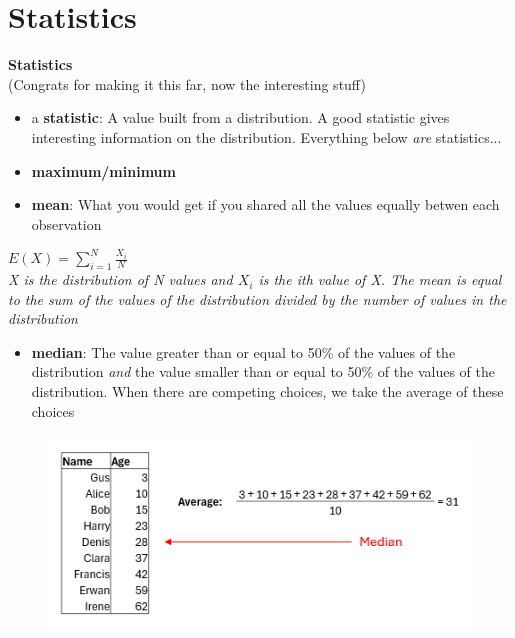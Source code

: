 \documentclass[compress]{beamer}
\begin{document}
\section{Statistics}
\begin{frame}[plain]
    \centering \Large
    \textbf{Statistics} \\
	(Congrats for making it this far, now the interesting stuff)
\end{frame}

\begin{frame}
	\begin{itemize}
		\item a \textbf{statistic}: A value built from a distribution. A good statistic gives interesting information on the distribution. Everything below \textit{are} statistics...
		\vspace{0.2cm}
		\item \textbf{maximum/minimum}
		\vspace{0.2cm}
		\item \textbf{mean}: What you would get if you shared all the values equally betwen each observation
	\end{itemize}
	\vspace{0.2cm}
	$E(X) = \sum_{i=1}^{N}\frac{X_{i}}{N}$ \\
	\vspace{0.2cm}
	\textit{X is the distribution of N values and $X_{i}$ is the ith value of X. The mean is equal to the sum of the values of the distribution divided by the number of values in the distribution}
	\vspace{0.2cm}
	\begin{itemize}
		\item \textbf{median}: The value greater than or equal to 50\% of the values of the distribution \textit{and} the value smaller than or equal to 50\% of the values of the distribution. When there are competing choices, we take the average of these choices
	\end{itemize}
\end{frame}

\begin{frame}
	\begin{figure}
		\centering
		\includegraphics[scale=1]{Picture/Example mean median.PNG}
	\end{figure}
\end{frame}
\end{document}
